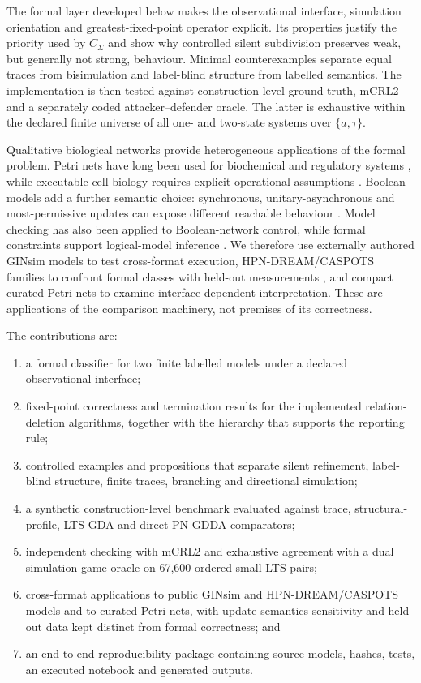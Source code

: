 \documentclass[JMCS,submit]{resources/ISRP}
\theoremstyle{definition}
\theoremstyle{remark}
\numberwithin{equation}{section}
\newcommand{\TAU}{\tau}
\begin{document}
The formal layer developed below makes the observational interface, simulation
orientation and greatest-fixed-point operator explicit. Its properties justify
the priority used by $C_{\Sigma}$ and show why controlled silent subdivision
preserves weak, but generally not strong, behaviour. Minimal counterexamples
separate equal traces from bisimulation and label-blind structure from labelled
semantics. The implementation is then tested against construction-level ground
truth, mCRL2 and a separately coded attacker--defender oracle. The latter is
exhaustive within the declared finite universe of all one- and two-state systems
over $\{a,\TAU\}$.

Qualitative biological networks provide heterogeneous applications of the formal
problem. Petri nets have long been used for biochemical and regulatory systems
\cite{Koch2005,ChaouiyaPetriBio2007,Heiner2008}, while executable cell biology
requires explicit operational assumptions \cite{Regev2002,Fisher2007}. Boolean
models add a further semantic choice: synchronous, unitary-asynchronous and
most-permissive updates can expose different reachable behaviour
\cite{Pauleve2020}. Model checking has also been applied to Boolean-network
control, while formal constraints support logical-model inference
\cite{CifuentesFontanals2022,Benes2023}. We therefore use externally authored
GINsim models to test cross-format execution, HPN-DREAM/CASPOTS families to
confront formal classes with held-out measurements \cite{Hill2016,Razzaq2018},
and compact curated Petri nets to examine interface-dependent interpretation.
These are applications of the comparison machinery, not premises of its
correctness.

The contributions are:
\begin{enumerate}
\item a formal classifier for two finite labelled models under a declared
observational interface;
\item fixed-point correctness and termination results for the implemented
relation-deletion algorithms, together with the hierarchy that supports the
reporting rule;
\item controlled examples and propositions that separate silent refinement,
label-blind structure, finite traces, branching and directional simulation;
\item a synthetic construction-level benchmark evaluated against trace,
structural-profile, LTS-GDA and direct PN-GDDA comparators;
\item independent checking with mCRL2 and exhaustive agreement with a dual
simulation-game oracle on 67,600 ordered small-LTS pairs;
\item cross-format applications to public GINsim and HPN-DREAM/CASPOTS models and
to curated Petri nets, with update-semantics sensitivity and held-out data kept
distinct from formal correctness; and
\item an end-to-end reproducibility package containing source models, hashes,
tests, an executed notebook and generated outputs.
\end{enumerate}
\end{document}

